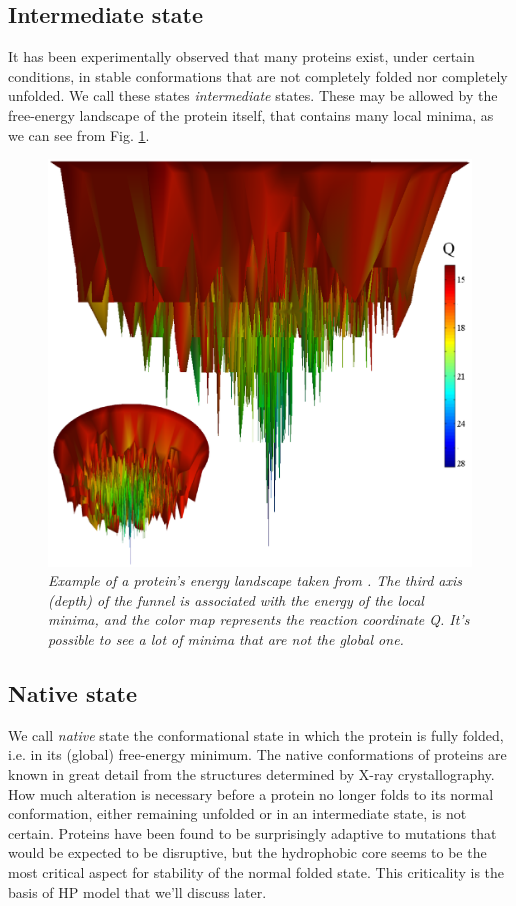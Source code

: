 \subsection{Intermediate state}
It has been experimentally observed that many proteins exist, under certain conditions, in stable conformations that are not completely folded nor completely unfolded.
We call these states \emph{intermediate} states.
These may be allowed by the free-energy landscape of the protein itself, that contains many local minima, as we can see from Fig. \ref{fig:energy_landscape}.
\begin{figure}[H]
    \centering
    \includegraphics[width=.6\textwidth]{./img/energy_landscape.png}
    \caption{\emph{Example of a protein's energy landscape taken from \cite{energyLandscape}.
                The third axis (depth) of the funnel is associated with the energy of the local minima, and the color map represents the reaction coordinate Q.
                It's possible to see a lot of minima that are not the global one.}}
    \label{fig:energy_landscape}
\end{figure}

\subsection{Native state}
We call \emph{native} state the conformational state in which the protein is fully folded, i.e. in its (global) free-energy minimum.
The native conformations of proteins are known in great detail from the structures determined by X-ray crystallography.
How much alteration is necessary before a protein no longer folds to its normal conformation, either remaining unfolded or in an intermediate state, is not certain.
Proteins have been found to be surprisingly adaptive to mutations that would be expected to be disruptive, but the hydrophobic core seems to be the most critical aspect for stability of the normal folded state.
This criticality is the basis of HP model that we'll discuss later.


